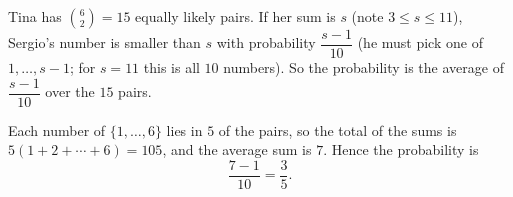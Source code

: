 Tina has $\binom62=15$ equally likely pairs. If her sum is $s$ (note $3\le s\le11$), Sergio's number is smaller than $s$ with probability $\dfrac{s-1}{10}$ (he must pick one of $1,\dots,s-1$; for $s=11$ this is all $10$ numbers). So the probability is the average of $\dfrac{s-1}{10}$ over the $15$ pairs.

Each number of $\{1,\dots,6\}$ lies in $5$ of the pairs, so the total of the sums is $5(1+2+\cdots+6)=105$, and the average sum is $7$. Hence the probability is
\[
\dfrac{7-1}{10}=\boxed{\dfrac{3}{5}}.
\]
